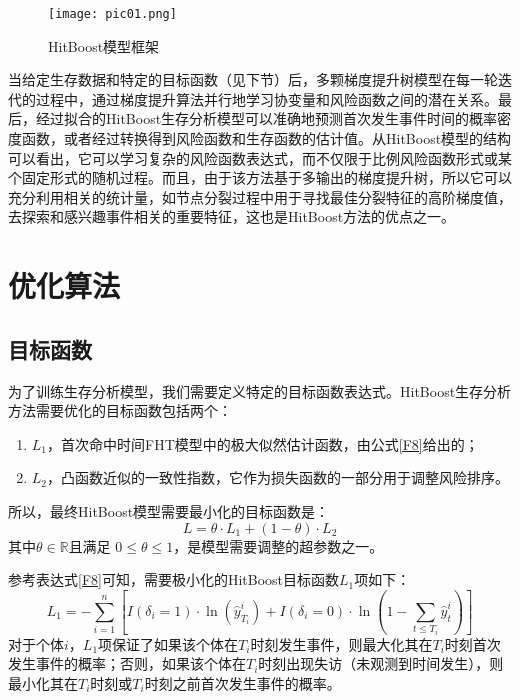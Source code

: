 \begin{figure}[h]
\texttt{[image: pic01.png]}
\caption{HitBoost模型框架}
\label{pic01}
\end{figure}

当给定生存数据和特定的目标函数（见下节）后，多颗梯度提升树模型在每一轮迭代的过程中，通过梯度提升算法并行地学习协变量和风险函数之间的潜在关系。最后，经过拟合的HitBoost生存分析模型可以准确地预测首次发生事件时间的概率密度函数，或者经过转换得到风险函数和生存函数的估计值。从HitBoost模型的结构可以看出，它可以学习复杂的风险函数表达式，而不仅限于比例风险函数形式或某个固定形式的随机过程。而且，由于该方法基于多输出的梯度提升树，所以它可以充分利用相关的统计量，如节点分裂过程中用于寻找最佳分裂特征的高阶梯度值，去探索和感兴趣事件相关的重要特征，这也是HitBoost方法的优点之一。

\section{优化算法}

\subsection{目标函数}

为了训练生存分析模型，我们需要定义特定的目标函数表达式。HitBoost生存分析方法需要优化的目标函数包括两个：
\begin{enumerate}
    \item $L_1$，首次命中时间FHT模型中的极大似然估计函数，由公式\eqref{F8}给出的；
    \item $L_2$，凸函数近似的一致性指数，它作为损失函数的一部分用于调整风险排序。
\end{enumerate}
所以，最终HitBoost模型需要最小化的目标函数是：
\begin{equation}
L=\theta \cdot L_1 + (1-\theta) \cdot L_2 \label{F33}
\end{equation}
其中$\theta \in \mathbb{R}$且满足 $0 \le \theta \le 1$，是模型需要调整的超参数之一。
 
参考表达式\eqref{F8}可知，需要极小化的HitBoost目标函数$L_1$项如下：
\begin{equation}
L_1 = -\sum_{i=1}^{n} \left[ I(\delta_i=1)\cdot \ln(\hat{y}_{T_i}^i) + I(\delta_i=0)\cdot \ln(1-\sum_{t\le T_i}\hat{y}_t^i) \right]
\end{equation}
对于个体$i$，$L_1$项保证了如果该个体在$T_i$时刻发生事件，则最大化其在$T_i$时刻首次发生事件的概率；否则，如果该个体在$T_i$时刻出现失访（未观测到时间发生），则最小化其在$T_i$时刻或$T_i$时刻之前首次发生事件的概率。

